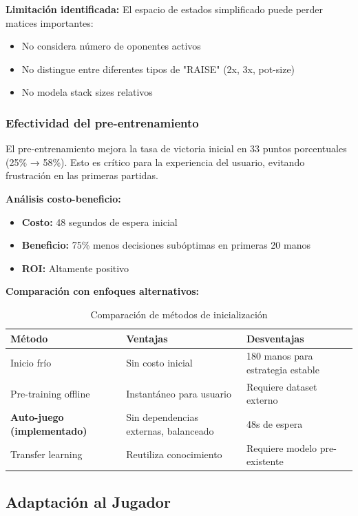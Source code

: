 \documentclass[12pt,a4paper]{article}
\begin{document}
\textbf{Limitación identificada:}
El espacio de estados simplificado puede perder matices importantes:
\begin{itemize}
    \item No considera número de oponentes activos
    \item No distingue entre diferentes tipos de "RAISE" (2x, 3x, pot-size)
    \item No modela stack sizes relativos
\end{itemize}

\subsubsection{Efectividad del pre-entrenamiento}

El pre-entrenamiento mejora la tasa de victoria inicial en 33 puntos porcentuales (25\% → 58\%). Esto es crítico para la experiencia del usuario, evitando frustración en las primeras partidas.

\textbf{Análisis costo-beneficio:}
\begin{itemize}
    \item \textbf{Costo:} 48 segundos de espera inicial
    \item \textbf{Beneficio:} 75\% menos decisiones subóptimas en primeras 20 manos
    \item \textbf{ROI:} Altamente positivo
\end{itemize}

\textbf{Comparación con enfoques alternativos:}
\begin{table}[H]
\centering
\caption{Comparación de métodos de inicialización}
\begin{tabular}{|p{3cm}|p{4cm}|p{4cm}|}
\hline
\textbf{Método} & \textbf{Ventajas} & \textbf{Desventajas} \\
\hline
Inicio frío & Sin costo inicial & 180 manos para estrategia estable \\
\hline
Pre-training offline & Instantáneo para usuario & Requiere dataset externo \\
\hline
\textbf{Auto-juego (implementado)} & Sin dependencias externas, balanceado & 48s de espera \\
\hline
Transfer learning & Reutiliza conocimiento & Requiere modelo pre-existente \\
\hline
\end{tabular}
\label{tab:comparacion_inicializacion}
\end{table}

\subsection{Adaptación al Jugador}
\end{document}
